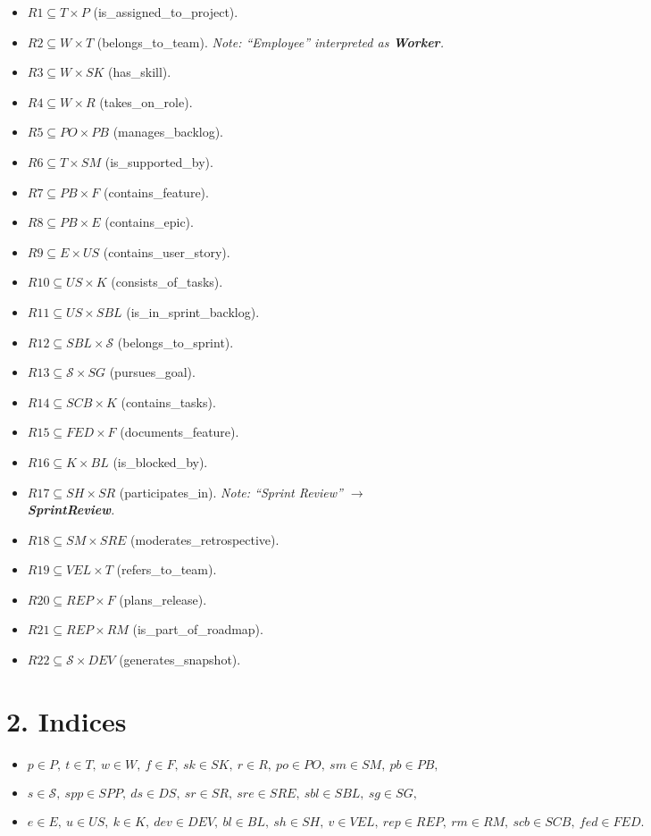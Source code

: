 \documentclass[11pt,a4paper]{article}
\begin{document}
\begin{itemize}
  \item $R1 \subseteq T \times P$ (is\_assigned\_to\_project).
  \item $R2 \subseteq W \times T$ (belongs\_to\_team). \emph{Note: ``Employee'' interpreted as \textbf{Worker}.}
  \item $R3 \subseteq W \times S\!K$ (has\_skill).
  \item $R4 \subseteq W \times R$ (takes\_on\_role).
  \item $R5 \subseteq PO \times PB$ (manages\_backlog).
  \item $R6 \subseteq T \times SM$ (is\_supported\_by).
  \item $R7 \subseteq PB \times F$ (contains\_feature).
  \item $R8 \subseteq PB \times E$ (contains\_epic).
  \item $R9 \subseteq E \times US$ (contains\_user\_story).
  \item $R10 \subseteq US \times K$ (consists\_of\_tasks).
  \item $R11 \subseteq US \times SBL$ (is\_in\_sprint\_backlog).
  \item $R12 \subseteq SBL \times \mathcal{S}$ (belongs\_to\_sprint).
  \item $R13 \subseteq \mathcal{S} \times SG$ (pursues\_goal).
  \item $R14 \subseteq SCB \times K$ (contains\_tasks).
  \item $R15 \subseteq FED \times F$ (documents\_feature).
  \item $R16 \subseteq K \times BL$ (is\_blocked\_by).
  \item $R17 \subseteq SH \times SR$ (participates\_in). \emph{Note: ``Sprint Review'' $\rightarrow$ \textbf{SprintReview}.}
  \item $R18 \subseteq SM \times SRE$ (moderates\_retrospective).
  \item $R19 \subseteq VEL \times T$ (refers\_to\_team).
  \item $R20 \subseteq REP \times F$ (plans\_release).
  \item $R21 \subseteq REP \times RM$ (is\_part\_of\_roadmap).
  \item $R22 \subseteq \mathcal{S} \times DEV$ (generates\_snapshot).
\end{itemize}

\section{2. Indices}
\begin{itemize}
  \item $p \in P,\ t \in T,\ w \in W,\ f \in F,\ sk \in S\!K,\ r \in R,\ po \in PO,\ sm \in SM,\ pb \in PB,$
  \item $s \in \mathcal{S},\ spp \in SPP,\ ds \in DS,\ sr \in SR,\ sre \in SRE,\ sbl \in SBL,\ sg \in SG,$
  \item $e \in E,\ u \in US,\ k \in K,\ dev \in DEV,\ bl \in BL,\ sh \in SH,\ v \in VEL,\ rep \in REP,\ rm \in RM,\ scb \in SCB,\ fed \in FED.$
\end{itemize}
\end{document}
